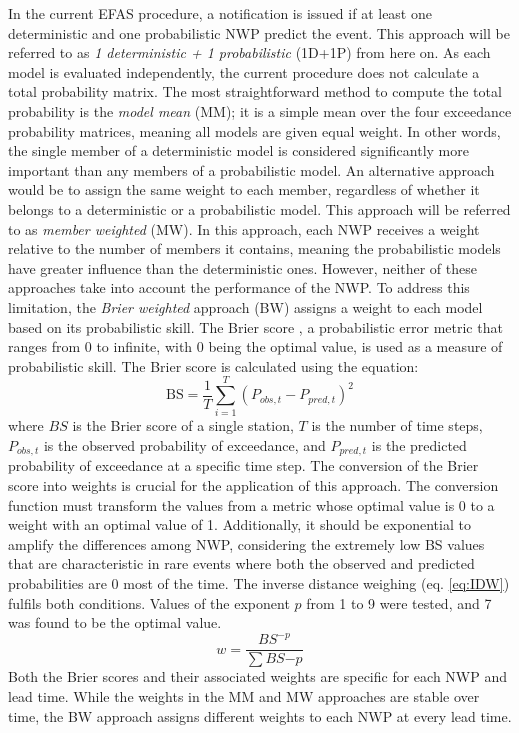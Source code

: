 \documentclass[preprint,12pt,authoryear]{elsarticle}
\begin{document}
In the current EFAS procedure, a notification is issued if at least one deterministic and one probabilistic NWP predict the event. This approach will be referred to as \textit{1 deterministic + 1 probabilistic} (1D+1P) from here on. As each model is evaluated independently, the current procedure does not calculate a total probability matrix. The most straightforward method to compute the total probability is the \textit{model mean} (MM); it is a simple mean over the four exceedance probability matrices, meaning all models are given equal weight. In other words, the single member of a deterministic model is considered significantly more important than any members of a probabilistic model. An alternative approach would be to assign the same weight to each member, regardless of whether it belongs to a deterministic or a probabilistic model. This approach will be referred to as \textit{member weighted} (MW). In this approach, each NWP receives a weight relative to the number of members it contains, meaning the probabilistic models have greater influence than the deterministic ones. However, neither of these approaches take into account the performance of the NWP. To address this limitation, the \textit{Brier weighted} approach (BW) assigns a weight to each model based on its probabilistic skill. The Brier score \cite{Brier1950}, a probabilistic error metric that ranges from 0 to infinite, with 0 being the optimal value, is used as a measure of probabilistic skill. The Brier score is calculated using the equation:
\begin{equation}
    \label{eq:BS}
    \text{BS} = \frac{1}{T}\sum_{i=1}^{T} \left( P_{obs,t} - P_{pred,t} \right)^2
\end{equation}
where $BS$  is the Brier score of a single station, $T$  is the number of time steps, $P_{obs,t}$ is the observed probability of exceedance, and $P_{pred,t}$  is the predicted probability of exceedance at a specific time step. The conversion of the Brier score into weights is crucial for the application of this approach. The conversion function must transform the values from a metric whose optimal value is 0 to a weight with an optimal value of 1. Additionally, it should be exponential to amplify the differences among NWP, considering the extremely low BS values that are characteristic in rare events where both the observed and predicted probabilities are 0 most of the time. The inverse distance weighing (eq. \ref{eq:IDW}) fulfils both conditions. Values of the exponent $p$ from 1 to 9 were tested, and 7 was found to be the optimal value.
\begin{equation}
    \label{eq:IDW}
    w = \frac{BS^{-p}}{\sum BS{-p}}
\end{equation}
Both the Brier scores and their associated weights are specific for each NWP and lead time. While the weights in the MM and MW approaches are stable over time, the BW approach assigns different weights to each NWP at every lead time.
\end{document}
